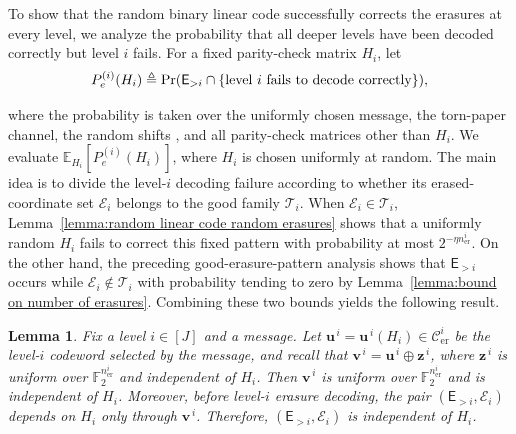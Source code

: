 \documentclass[journal,letterpaper,onecolumn,11pt]{IEEEtran}
\newcommand{\cC}{\mathcal{C}}
\newcommand{\cE}{\mathcal{E}}
\newcommand{\cT}{\mathcal{T}}
\newcommand{\boldu}{\mathbf{u}}
\newcommand{\boldv}{\mathbf{v}}
\newcommand{\boldz}{\mathbf{z}}
\newtheorem{lemma}{Lemma}
\begin{document}
To show that the random binary linear code successfully corrects the
erasures at every level, we analyze the probability that all deeper
levels have been decoded correctly but level \(i\) fails. For a fixed
parity-check matrix \(H_i\), let
\begin{equation}\label{equation:P_e^{(i)})}
    P_e^{(i)}(H_i)\triangleq\text{Pr}(\mathsf E_{>i}\cap\{\text{level \(i\) fails to decode correctly}\}),
\end{equation}

where the probability is taken over the uniformly chosen message, the
torn-paper channel, the random shifts , and all parity-check matrices other
than \(H_i\).
We evaluate
\(\mathbb E_{H_i}[P_e^{(i)}(H_i)]\), where \(H_i\) is chosen uniformly
at random.
The main idea is to divide the level-\(i\) decoding failure according to
whether its erased-coordinate set \(\cE_i\) belongs to the good family
\(\cT_i\).
When \(\cE_i\in\cT_i\), Lemma~\ref{lemma:random linear code random erasures}
shows that a uniformly random \(H_i\) fails to correct this fixed pattern
with probability at most \(2^{-\eta n_{\mathrm{er}}^i}\). On the other
hand, the preceding good-erasure-pattern analysis shows that
\(\mathsf E_{>i}\) occurs while \(\cE_i\notin\cT_i\) with probability
tending to zero by Lemma~\ref{lemma:bound on number of erasures}. 
Combining these two bounds yields the following result.

\begin{lemma}\label{lemma:shift-independence}
Fix a level \(i\in[J]\) and a message. Let
\(\boldu^{\,i}=\boldu^{\,i}(H_i)\in\cC_{\mathrm{er}}^i\) be the
level-\(i\) codeword selected by the message, and recall that
\(\boldv^{\,i}=\boldu^{\,i}\oplus\boldz^{\,i}\), where
\(\boldz^{\,i}\) is uniform over
\(\mathbb F_2^{n_{\mathrm{er}}^i}\) and independent of \(H_i\).
Then \(\boldv^{\,i}\) is uniform over
\(\mathbb F_2^{n_{\mathrm{er}}^i}\) and is independent of \(H_i\).
Moreover, before level-\(i\) erasure decoding, the pair
\((\mathsf E_{>i},\cE_i)\) depends on \(H_i\) only through
\(\boldv^{\,i}\). Therefore,
\((\mathsf E_{>i},\cE_i)\) is independent of \(H_i\).
\end{lemma}
\end{document}
